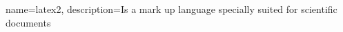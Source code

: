 
{
        name=latex2,
            description={Is a mark up language specially suited for 
scientific documents}
}



